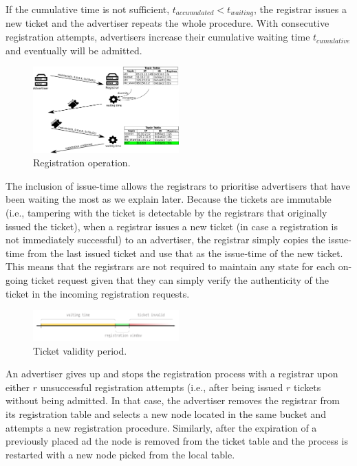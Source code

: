 If the cumulative time is not sufficient, $t_\textit{accumulated} < t_\textit{waiting}$, the registrar issues a new ticket and the advertiser repeats the whole procedure. With consecutive registration attempts, advertisers increase their cumulative waiting time $t_\textit{cumulative}$ and eventually will be admitted. 



\begin{figure}
    \includegraphics[width=0.5\textwidth]{img/registration}
    \caption{Registration operation.}
    \label{fig:registration}
\end{figure}

The inclusion of issue-time allows the registrars to prioritise advertisers that have been waiting the most as we explain later. Because the tickets are immutable (i.e., tampering with the ticket is detectable by the registrars that originally issued the ticket), when a registrar issues a new ticket (in case a registration is not immediately successful) to an advertiser, the registrar simply copies the issue-time from the last issued ticket and use that as the issue-time of the new ticket. This means that the registrars are not required to maintain any state for each on-going ticket request given that they can simply verify the authenticity of the ticket in the incoming registration requests. 


    
\begin{figure}
    \includegraphics[width=0.5\textwidth]{img/ticket-validity}
    \caption{Ticket validity period.}
    \label{fig:ticket_validity}
\end{figure}

An advertiser gives up and stops the registration process with a registrar upon either $r$ unsuccessful registration attempts (i.e., after being issued $r$ tickets without being admitted. In that case, the advertiser removes the registrar from its registration table and selects a new node located in the same bucket and attempts a new registration procedure. 
Similarly,  after the expiration of a previously placed ad the node is removed from the ticket table and the process is restarted with a new node picked from the local table.


